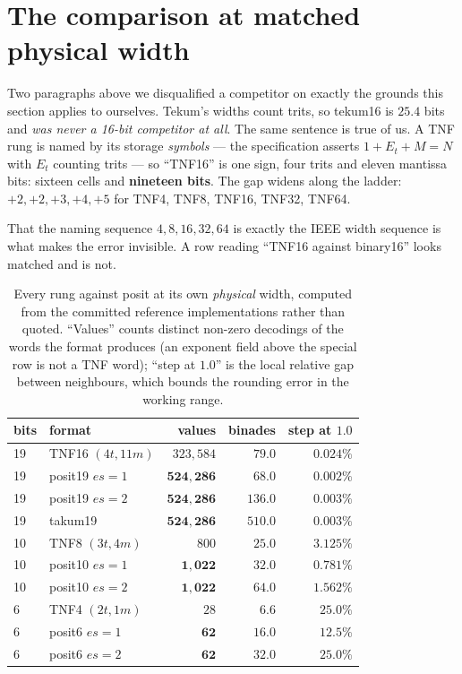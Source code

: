 \section{The comparison at matched physical width}\label{sec:matchedwidth}

Two paragraphs above we disqualified a competitor on exactly the grounds this
section applies to ourselves. Tekum's widths count trits, so tekum16 is
$25.4$ bits and \emph{was never a 16-bit competitor at all}. The same sentence
is true of us. A TNF rung is named by its storage \emph{symbols} --- the
specification asserts $1 + E_t + M = N$ with $E_t$ counting trits --- so
``TNF16'' is one sign, four trits and eleven mantissa bits: sixteen cells and
\textbf{nineteen bits}. The gap widens along the ladder: $+2, +2, +3, +4, +5$
for TNF4, TNF8, TNF16, TNF32, TNF64.

That the naming sequence $4, 8, 16, 32, 64$ is exactly the IEEE width sequence
is what makes the error invisible. A row reading ``TNF16 against binary16''
looks matched and is not.

\begin{table}[t]\centering
\caption{Every rung against posit at its own \emph{physical} width, computed
from the committed reference implementations rather than quoted. ``Values'' counts
distinct non-zero decodings of the words the format produces (an exponent field
above the special row is not a TNF word); ``step at $1.0$'' is the local relative
gap between neighbours, which bounds the rounding error in the working range.}
\label{tab:matchedwidth}
\begin{tabular}{llrrr}
\toprule
bits & format & values & binades & step at $1.0$ \\
\midrule
19 & TNF16 $(4t,11m)$ & $323{,}584$          & $79.0$  & $0.024\%$ \\
19 & posit19 $es{=}1$ & $\mathbf{524{,}286}$ & $68.0$  & $\mathbf{0.002\%}$ \\
19 & posit19 $es{=}2$ & $\mathbf{524{,}286}$ & $\mathbf{136.0}$ & $\mathbf{0.003\%}$ \\
19 & takum19          & $\mathbf{524{,}286}$ & $\mathbf{510.0}$ & $\mathbf{0.003\%}$ \\
\midrule
10 & TNF8 $(3t,4m)$   & $800$              & $25.0$ & $3.125\%$ \\
10 & posit10 $es{=}1$ & $\mathbf{1{,}022}$ & $\mathbf{32.0}$ & $\mathbf{0.781\%}$ \\
10 & posit10 $es{=}2$ & $\mathbf{1{,}022}$ & $\mathbf{64.0}$ & $\mathbf{1.562\%}$ \\
\midrule
6  & TNF4 $(2t,1m)$   & $28$          & $6.6$  & $25.0\%$ \\
6  & posit6 $es{=}1$  & $\mathbf{62}$ & $\mathbf{16.0}$ & $\mathbf{12.5\%}$ \\
6  & posit6 $es{=}2$  & $\mathbf{62}$ & $\mathbf{32.0}$ & $25.0\%$ \\
\bottomrule
\end{tabular}
\end{table}

